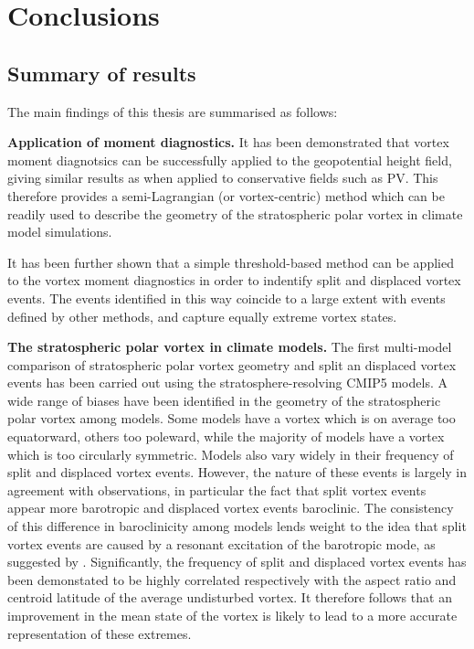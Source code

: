 \chapter{Conclusions}
\label{cha:conclusions}

\section{Summary of results}

The main findings of this thesis are summarised as follows: 

\bigskip\noindent\textbf{Application of moment diagnostics.} It has been
demonstrated that vortex moment diagnotsics can be successfully applied to the
geopotential height field, giving similar results as when applied to
conservative fields such as PV. This therefore provides a semi-Lagrangian (or
vortex-centric) method which can be readily used to describe the geometry of the
stratospheric polar vortex in climate model simulations.

It has been further shown that a simple threshold-based method can be applied to
the vortex moment diagnostics in order to indentify split and displaced vortex
events. The events identified in this way coincide to a large extent with events
defined by other methods, and capture equally extreme vortex states.

\bigskip\noindent\textbf{The stratospheric polar vortex in climate models.} The
first multi-model comparison of stratospheric polar vortex geometry and split an
displaced vortex events has been carried out using the stratosphere-resolving
CMIP5 models. A wide range of biases have been identified in the geometry of the
stratospheric polar vortex among models. Some models have a vortex which is on
average too equatorward, others too poleward, while the majority of models have
a vortex which is too circularly symmetric. Models also vary widely in their
frequency of split and displaced vortex events. However, the nature of these
events is largely in agreement with observations, in particular the fact that
split vortex events appear more barotropic and displaced vortex events
baroclinic. The consistency of this difference in baroclinicity among models
lends weight to the idea that split vortex events are caused by a resonant
excitation of the barotropic mode, as suggested by
\citet{Esler2005}. Significantly, the frequency of split and displaced vortex
events has been demonstated to be highly correlated respectively with the aspect
ratio and centroid latitude of the average undisturbed vortex. It therefore
follows that an improvement in the mean state of the vortex is likely to lead to
a more accurate representation of these extremes.

